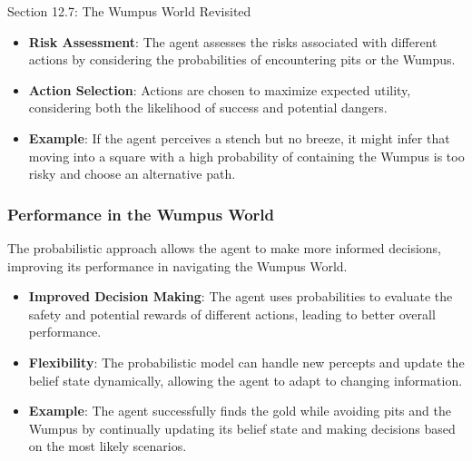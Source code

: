 \begin{notes}{Section 12.7: The Wumpus World Revisited}
\begin{highlight}
        \begin{itemize}
            \item \textbf{Risk Assessment}: The agent assesses the risks associated with different actions by considering the probabilities of encountering pits or the Wumpus.
            \item \textbf{Action Selection}: Actions are chosen to maximize expected utility, considering both the likelihood of success and potential dangers.
            \item \textbf{Example}: If the agent perceives a stench but no breeze, it might infer that moving into a square with a high probability of containing the Wumpus is too risky and choose an 
            alternative path.
        \end{itemize}
    
    \end{highlight}
    
    \subsubsection*{Performance in the Wumpus World}
    
    The probabilistic approach allows the agent to make more informed decisions, improving its performance in navigating the Wumpus World.
    
    \begin{highlight}
    
        \begin{itemize}
            \item \textbf{Improved Decision Making}: The agent uses probabilities to evaluate the safety and potential rewards of different actions, leading to better overall performance.
            \item \textbf{Flexibility}: The probabilistic model can handle new percepts and update the belief state dynamically, allowing the agent to adapt to changing information.
            \item \textbf{Example}: The agent successfully finds the gold while avoiding pits and the Wumpus by continually updating its belief state and making decisions based on the most likely scenarios.
        \end{itemize}
    
    \end{highlight}
    
    \begin{highlight}
    

\end{highlight}
\end{notes}
